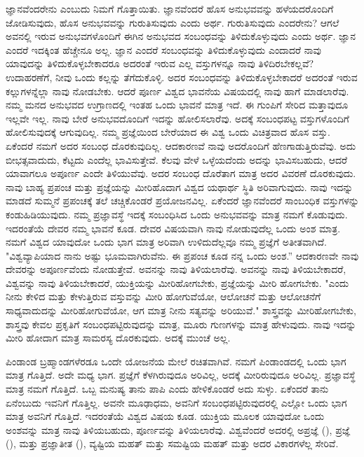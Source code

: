 ಜ್ಞಾನವೆಂದರೇನು ಎಂಬುದು ನಿಮಗೆ ಗೊತ್ತಾಯಿತು. ಜ್ಞಾನವೆಂದರೆ ಹೊಸ ಅನುಭವವನ್ನು ಹಳೆಯದರೊಂದಿಗೆ ಜೋಡಿಸುವುದು, ಹೊಸ ಅನುಭವವನ್ನು ಗುರುತಿಸುವುದು ಎಂದು ಅರ್ಥ. ಗುರುತಿಸುವುದು ಎಂದರೇನು? ಆಗಲೆ ಅವನಲ್ಲಿ ಇರುವ ಅನುಭವಗಳೊಂದಿಗೆ ಈಗಿನ ಅನುಭವದ ಸಂಬಂಧವನ್ನು ತಿಳಿದುಕೊಳ್ಳುವುದು ಎಂದು ಅರ್ಥ. ಜ್ಞಾನ ಎಂದರೆ ಇದಕ್ಕಿಂತ ಹೆಚ್ಚೇನೂ ಅಲ್ಲ. ಜ್ಞಾನ ಎಂದರೆ ಸಂಬಂಧವನ್ನು ತಿಳಿದುಕೊಳ್ಳುವುದು ಎಂದಾದರೆ ನಾವು ಯಾವುದನ್ನು ತಿಳಿದುಕೊಳ್ಳಬೇಕಾದರೂ ಅದರಂತೆ ಇರುವ ಎಲ್ಲ ವಸ್ತುಗಳನ್ನೂ ನಾವು ತಿಳಿದಿರಬೇಕಲ್ಲವೆ? ಉದಾಹರಣೆಗೆ, ನೀವು ಒಂದು ಕಲ್ಲನ್ನು ತೆಗೆದುಕೊಳ್ಳಿ. ಅದರ ಸಂಬಂಧವನ್ನು ತಿಳಿದುಕೊಳ್ಳಬೇಕಾದರೆ ಅದರಂತೆ ಇರುವ ಕಲ್ಲುಗಳನ್ನೆಲ್ಲಾ ನಾವು ನೋಡಬೇಕು. ಆದರೆ ಪೂರ್ಣ ವಿಶ್ವದ ಭಾವನೆಯ ವಿಷಯದಲ್ಲಿ ನಾವು ಹಾಗೆ ಮಾಡಲಾರೆವು. ನಮ್ಮ ಮನದ ಅನುಭವದ ಉಗ್ರಾಣದಲ್ಲಿ ಇಂತಹ ಒಂದು ಭಾವನೆ ಮಾತ್ರ ಇದೆ. ಈ ಗುಂಪಿಗೆ ಸೇರಿದ ಮತ್ತಾವುದೂ ಇಲ್ಲವೇ ಇಲ್ಲ. ನಾವು ಬೇರೆ ಅನುಭವದೊಂದಿಗೆ ಇದನ್ನು ಹೋಲಿಸಲಾರೆವು. ಅದಕ್ಕೆ ಸಂಬಂಧಪಟ್ಟ ವಸ್ತುಗಳೊಂದಿಗೆ ಹೋಲಿಸುವುದಕ್ಕೆ ಆಗುವುದಿಲ್ಲ. ನಮ್ಮ ಪ್ರಜ್ಞೆಯಿಂದ ಬೇರೆಯಾದ ಈ ವಿಶ್ವ ಒಂದು ವಿಚಿತ್ರವಾದ ಹೊಸ ವಸ್ತು. ಏಕೆಂದರೆ ನಮಗೆ ಅದರ ಸಂಬಂಧ ದೊರಕುವುದಿಲ್ಲ. ಆದಕಾರಣವೆ ನಾವು ಅದರೊಂದಿಗೆ ಹೆಣಗಾಡುತ್ತಿರುವೆವು. ಅದು ಬೀಭತ್ಸವಾದುದು, ಕೆಟ್ಟದು ಎಂದೆಲ್ಲ ಭಾವಿಸುತ್ತೇವೆ. ಕೆಲವು ವೇಳೆ ಒಳ್ಳೆಯದೆಂದು ಅದನ್ನು ಭಾವಿಸಬಹುದು, ಆದರೆ ಯಾವಾಗಲೂ ಅಪೂರ್ಣ ಎಂದೇ ತಿಳಿಯುವೆವು. ಅದರ ಸಂಬಂಧ ದೊರೆತಾಗ ಮಾತ್ರ ಅದರ ವಿವರಣೆ ದೊರಕುವುದು. ನಾವು ಬಾಹ್ಯ ಪ್ರಪಂಚ ಮತ್ತು ಪ್ರಜ್ಞೆಯನ್ನು ಮೀರಿಹೊದಾಗ ವಿಶ್ವದ ಯಥಾರ್ಥ ಸ್ಥಿತಿ ಅರಿವಾಗುವುದು. ನಾವು ಇದನ್ನು ಮಾಡದೆ ಸುಮ್ಮನೆ ಪ್ರಪಂಚಕ್ಕೆ ತಲೆ ಚಚ್ಚಿಕೊಂಡರೆ ಪ್ರಯೋಜನವಿಲ್ಲ. ಏಕೆಂದರೆ ಜ್ಞಾನವೆಂದರೆ ಸಾಂಬಂಧಿಕ ವಸ್ತುಗಳನ್ನು ಕಂಡುಹಿಡಿಯುವುದು. ನಮ್ಮ ಪ್ರಜ್ಞಾವಸ್ಥೆ ಇದಕ್ಕೆ ಸಂಬಂಧಿಸಿದ ಒಂದು ಅನುಭವವನ್ನು ಮಾತ್ರ ನಮಗೆ ಕೊಡುವುದು. ಇದರಂತೆಯೆ ದೇವರ ನಮ್ಮ ಭಾವನೆ ಕೂಡ. ದೇವರ ವಿಷಯವಾಗಿ ನಾವು ನೋಡುವುದೆಲ್ಲ ಒಂದು ಅಂಶ ಮಾತ್ರ. ನಮಗೆ ವಿಶ್ವದ ಯಾವುದೋ ಒಂದು ಭಾಗ ಮಾತ್ರ ಅರಿವಾಗಿ ಉಳಿದುದೆಲ್ಲವೂ ನಮ್ಮ ಪ್ರಜ್ಞೆಗೆ ಅತೀತವಾಗಿದೆ. "ವಿಶ್ವವ್ಯಾಪಿಯಾದ ನಾನು ಅಷ್ಟು ಭೂಮವಾಗಿರುವೆನು. ಈ ಪ್ರಪಂಚ ಕೂಡ ನನ್ನ ಒಂದು ಅಂಶ.'' ಆದಕಾರಣವೇ ನಾವು ದೇವರನ್ನು ಅಪೂರ್ಣವೆಂದು ನೋಡುತ್ತೇವೆ. ಅವನನ್ನು ನಾವು ತಿಳಿಯಲಾರೆವು. ಅವನನ್ನು ನಾವು ತಿಳಿಯಬೇಕಾದರೆ, ವಿಶ್ವವನ್ನು ನಾವು ತಿಳಿಯಬೇಕಾದರೆ, ಯುಕ್ತಿಯನ್ನು ಮೀರಿಹೋಗಬೇಕು, ಪ್ರಜ್ಞೆಯನ್ನು ಮೀರಿ ಹೋಗಬೇಕು. "ಎಂದು ನೀನು ಕೇಳಿದ ಮತ್ತು ಕೇಳುತ್ತಿರುವ ವಸ್ತುವನ್ನು ಮೀರಿ ಹೋಗುವೆಯೋ, ಆಲೋಚನೆ ಮತ್ತು ಆಲೋಚನೆಗೆ ಸಾಧ್ಯವಾದುದನ್ನು ಮೀರಿಹೋಗುವೆಯೋ, ಆಗ ಮಾತ್ರ ನೀನು ಸತ್ಯವನ್ನು ಅರಿಯುವೆ." ಶಾಸ್ತ್ರವನ್ನು ಮೀರಿಹೋಗಬೇಕು, ಶಾಸ್ತ್ರವು ಕೇವಲ ಪ್ರಕೃತಿಗೆ ಸಂಬಂಧಪಟ್ಟಿರುವುದನ್ನು ಮಾತ್ರ, ಮೂರು ಗುಣಗಳನ್ನು ಮಾತ್ರ ಹೇಳುವುದು. ನಾವು ಇದನ್ನು ಮೀರಿ ಹೋದಾಗ ಮಾತ್ರ ಸಾಮರಸ್ಯ ದೊರಕುವುದು. ಅದಕ್ಕೆ ಮುಂಚೆ ಅಲ್ಲ.

ಪಿಂಡಾಂಡ ಬ್ರಹ್ಮಾಂಡಗಳೆರಡೂ ಒಂದೇ ಯೋಜನೆಯ ಮೇಲೆ ರಚಿತವಾಗಿವೆ. ನಮಗೆ ಪಿಂಡಾಂಡದಲ್ಲಿ ಒಂದು ಭಾಗ ಮಾತ್ರ ಗೊತ್ತಿದೆ. ಅದೇ ಮಧ್ಯ ಭಾಗ. ಪ್ರಜ್ಞೆಗೆ ಕೆಳಗಿರುವುದೂ ಅರಿವಿಲ್ಲ, ಅದಕ್ಕೆ ಮೀರಿರುವುದೂ ಅರಿವಿಲ್ಲ. ಪ್ರಜ್ಞಾವಸ್ಥೆ ಮಾತ್ರ ನಮಗೆ ಗೊತ್ತಿದೆ. ಒಬ್ಬ ಮನುಷ್ಯ ತಾನು ಪಾಪಿ ಎಂದು ಹೇಳಿಕೊಂಡರೆ ಅದು ಸುಳ್ಳು. ಏಕೆಂದರೆ ತಾನು ಏನೆಂಬುದು ಇವನಿಗೆ ಗೊತ್ತಿಲ್ಲ. ಅವನೇ ಮೂಢಾಧಮ, ಅವನಿಗೆ ಸಂಬಂಧಪಟ್ಟಿರುವುದರಲ್ಲಿ ಎಲ್ಲೋ ಒಂದು ಭಾಗ ಮಾತ್ರ ಅವನಿಗೆ ಗೊತ್ತಿದೆ. ಇದರಂತೆಯೆ ವಿಶ್ವದ ವಿಷಯ ಕೂಡ. ಯುಕ್ತಿಯ ಮೂಲಕ ಯಾವುದೋ ಒಂದು ಅಂಶವನ್ನು ಮಾತ್ರ ನಾವು ತಿಳಿಯಬಹುದು, ಪೂರ್ಣವನ್ನು ತಿಳಿಯಲಾರೆವು. ವಿಶ್ವವೆಂದರೆ ಅದರಲ್ಲಿ ಅಪ್ರಜ್ಞೆ (), ಪ್ರಜ್ಞೆ (), ಮತ್ತು ಪ್ರಜ್ಞಾತೀತ (), ವ್ಯಷ್ಟಿಯ ಮಹತ್ ಮತ್ತು ಸಮಷ್ಟಿಯ ಮಹತ್ ಮತ್ತು ಅದರ ವಿಕಾರಗಳೆಲ್ಲ ಸೇರಿವೆ.

